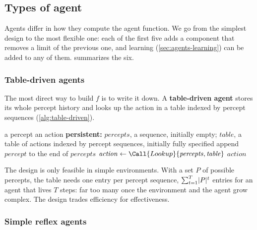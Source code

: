 \subsection{Types of agent}\label{sec:agents-types}

Agents differ in how they compute the agent function. We go from the simplest
design to the most flexible one: each of the first five adds a component that
removes a limit of the previous one, and learning (\cref{sec:agents-learning})
can be added to any of them.  summarizes the six.

\subsubsection{Table-driven agents}\label{sec:agents-table}

The most direct way to build $f$ is to write it down. A
\textbf{table-driven agent} stores its whole percept history and looks up the
action in a table indexed by percept sequences (\cref{alg:table-driven}).

\begin{algorithm}[htbp]
  \caption{Table-driven agent}\label{alg:table-driven}
  \begin{algorithmic}[1]
    \Require a percept
    \Ensure an action
    \Statex \textbf{persistent:} $\mathit{percepts}$, a sequence, initially
      empty; $\mathit{table}$, a table of actions indexed by percept sequences,
      initially fully specified
      \State append $\mathit{percept}$ to the end of $\mathit{percepts}$
      \State $\mathit{action} \gets \Call{Lookup}{\mathit{percepts},
        \mathit{table}}$
      \State \Return $\mathit{action}$
    \EndFunction
  \end{algorithmic}
\end{algorithm}

The design is only feasible in simple environments. With a set $P$ of possible
percepts, the table needs one entry per percept sequence,
$\sum_{t=1}^{T} \lvert P\rvert^t$ entries for an agent that lives $T$ steps: far too
many once the environment and the agent grow complex. The design trades
efficiency for effectiveness.

\subsubsection{Simple reflex agents}\label{sec:agents-reflex}

